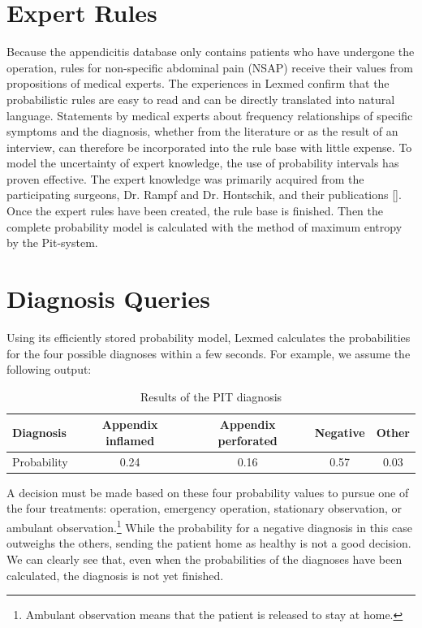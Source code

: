 \documentclass[10pt]{book}
\begin{document}
\section{Expert Rules}
Because the appendicitis database only contains patients who have undergone the operation, rules for non-specific abdominal pain (NSAP) receive their values from propositions of medical experts. The experiences in Lexmed confirm that the probabilistic rules are easy to read and can be directly translated into natural language. Statements by medical experts about frequency relationships of specific symptoms and the diagnosis, whether from the literature or as the result of an interview, can therefore be incorporated into the rule base with little expense. To model the uncertainty of expert knowledge, the use of probability intervals has proven effective. The expert knowledge was primarily acquired from the participating surgeons, Dr. Rampf and Dr. Hontschik, and their publications [\cite{hontschik1994appendektomie}].
Once the expert rules have been created, the rule base is finished. Then the complete probability model is calculated with the method of maximum entropy by the Pit-system.

\section{Diagnosis Queries}
Using its efficiently stored probability model, Lexmed calculates the probabilities for the four possible diagnoses within a few seconds. For example, we assume the following output:

\begin{table}[t]
\centering
\caption{Results of the PIT diagnosis}
\begin{tabular}{lcccc}
\hline
Diagnosis & Appendix inflamed & Appendix perforated & Negative & Other \\
\hline
Probability & 0.24 & 0.16 & 0.57 & 0.03 \\
\hline
\end{tabular}
\end{table}

A decision must be made based on these four probability values to pursue one of the four treatments: operation, emergency operation, stationary observation, or ambulant observation.\footnote{Ambulant observation means that the patient is released to stay at home.} While the probability for a negative diagnosis in this case outweighs the others, sending the patient home as healthy is not a good decision. We can clearly see that, even when the probabilities of the diagnoses have been calculated, the diagnosis is not yet finished.
\end{document}
